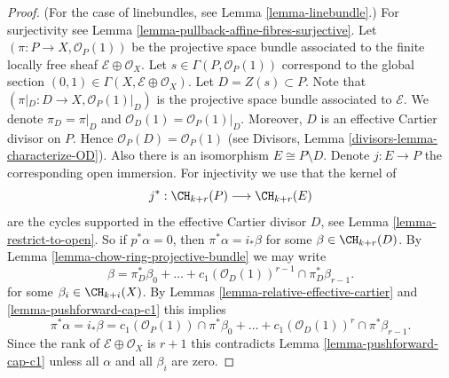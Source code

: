 \begin{proof}
(For the case of linebundles, see Lemma \ref{lemma-linebundle}.)
For surjectivity see Lemma \ref{lemma-pullback-affine-fibres-surjective}.
Let $(\pi  : P \to X, \mathcal{O}_P(1))$
be the projective space bundle associated
to the finite locally free sheaf $\mathcal{E} \oplus \mathcal{O}_X$.
Let $s \in \Gamma(P, \mathcal{O}_P(1))$ correspond to the global
section $(0, 1) \in \Gamma(X, \mathcal{E} \oplus \mathcal{O}_X)$.
Let $D = Z(s) \subset P$. Note that
$(\pi|_D : D \to X , \mathcal{O}_P(1)|_D)$
is the projective space bundle associated
to $\mathcal{E}$. We denote $\pi_D = \pi|_D$ and
$\mathcal{O}_D(1) = \mathcal{O}_P(1)|_D$.
Moreover, $D$ is an effective
Cartier divisor on $P$. Hence $\mathcal{O}_P(D) = \mathcal{O}_P(1)$
(see Divisors, Lemma \ref{divisors-lemma-characterize-OD}).
Also there is an isomorphism
$E \cong P \setminus D$. Denote $j : E \to P$ the
corresponding open immersion.
For injectivity we use that the kernel of
$$
j^* :
\CH_{k + r}(P)
\longrightarrow
\CH_{k + r}(E)
$$
are the cycles supported in the effective Cartier divisor $D$,
see Lemma \ref{lemma-restrict-to-open}. So if $p^*\alpha = 0$, then
$\pi^*\alpha = i_*\beta$ for some $\beta \in \CH_{k + r}(D)$.
By Lemma \ref{lemma-chow-ring-projective-bundle} we may write
$$
\beta = \pi_D^*\beta_0 +
\ldots + c_1(\mathcal{O}_D(1))^{r - 1} \cap \pi_D^* \beta_{r - 1}.
$$
for some $\beta_i \in \CH_{k + i}(X)$.
By Lemmas \ref{lemma-relative-effective-cartier}
and \ref{lemma-pushforward-cap-c1}
this implies
$$
\pi^*\alpha = i_*\beta =
c_1(\mathcal{O}_P(1)) \cap \pi^*\beta_0 +
\ldots +
c_1(\mathcal{O}_D(1))^r \cap \pi^*\beta_{r - 1}.
$$
Since the rank of $\mathcal{E} \oplus \mathcal{O}_X$ is $r + 1$
this contradicts Lemma \ref{lemma-pushforward-cap-c1} unless all
$\alpha$ and all $\beta_i$ are zero.
\end{proof}








